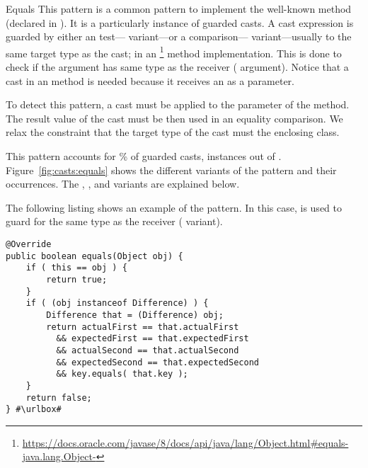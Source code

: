 \begin{pattern}{Equals}
This pattern is a common pattern to implement the well-known  method (declared in ).
It is a particularly instance of guarded casts.
A cast expression is guarded by either an
 test--- variant---or a
 comparison--- variant---usually to the same target type as the cast;
in an %
\footnote{\url{https://docs.oracle.com/javase/8/docs/api/java/lang/Object.html\#equals-java.lang.Object-}}
method implementation.
This is done to check if the argument has same type as the receiver
( argument).
Notice that a cast in an  method is needed because it
receives an  as a parameter.

To detect this pattern,
a cast must be applied to the parameter of the  method.
The result value of the cast must be then used in an equality comparison.
We relax the constraint that the target type of the cast must the enclosing class.

\instances{}
This pattern accounts for \nEqualsOutOfGuarded\% of guarded casts,
\nEqualsPattern{} instances out of \nGuarded{}.
Figure~\ref{fig:casts:equals} shows the different variants of the \thisp{} pattern and their occurrences.
The , , and
 variants are explained below.


The following listing shows an example of the \thisp{} pattern.
In this case,
 is used to guard for the same type as the receiver 
( variant).

\def\urlvar{http://bit.ly/neo4j_neo4j_2vJw94J}
\begin{verbatim}
@Override
public boolean equals(Object obj) {
    if ( this == obj ) {
        return true;
    }
    if ( (obj instanceof Difference) ) {
        Difference that = (Difference) obj;
        return actualFirst == that.actualFirst
          && expectedFirst == that.expectedFirst
          && actualSecond == that.actualSecond 
          && expectedSecond == that.expectedSecond
          && key.equals( that.key );
    }
    return false;
} #\urlbox#
\end{verbatim}


\end{pattern}
